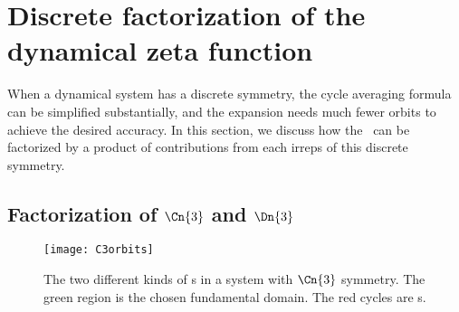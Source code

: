 

\section{Discrete factorization of the dynamical zeta function}
\label{sect:fact}

When a dynamical system has a discrete symmetry, the cycle averaging
formula
can be simplified substantially,
and the expansion needs
much fewer orbits to achieve the desired accuracy.
In this section, we discuss how the \dzeta\ can be factorized by a
product of contributions from each irreps of this discrete symmetry.

\subsection{Factorization of $\Cn{3}$ and $\Dn{3}$}

\begin{figure}[h]
  \centering
  \texttt{[image: C3orbits]}
  \caption[Orbits in a system with $\Cn{3}$ symmetry.]{
    The two different kinds of \po s in a system with
    $\Cn{3}$ symmetry.
    The green region is the chosen fundamental domain.
    The red cycles are \po s.
  }
  \label{fig:C3orbits}
\end{figure}

